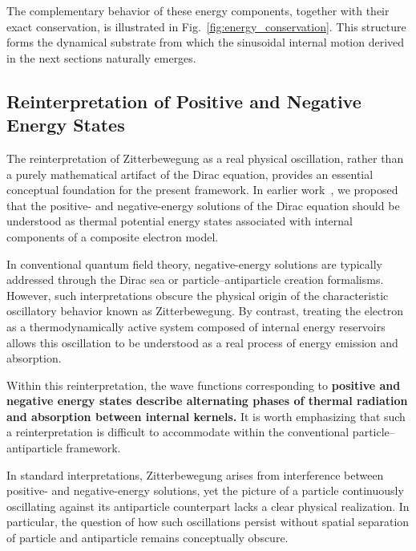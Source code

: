 \documentclass[%
 reprint,
 amsmath,amssymb,
 aps,
 prb,
]{revtex4-2}
\numberwithin{equation}{section}
\begin{document}
The complementary behavior of these energy components, together with their exact conservation, is illustrated in Fig.~\ref{fig:energy_conservation}. This structure forms the dynamical substrate from which the sinusoidal internal motion derived in the next sections naturally emerges.


\subsection{Reinterpretation of Positive and Negative Energy States}
\label{subsec:reinterpretation_positive}

The reinterpretation of Zitterbewegung as a real physical oscillation, rather than a purely mathematical artifact of the Dirac equation, provides an essential conceptual foundation for the present framework. In earlier work~\cite{hanamura17760132}, we proposed that the positive- and negative-energy solutions of the Dirac equation should be understood as thermal potential energy states associated with internal components of a composite electron model.

In conventional quantum field theory, negative-energy solutions are typically addressed through the Dirac sea or particle--antiparticle creation formalisms. However, such interpretations obscure the physical origin of the characteristic oscillatory behavior known as Zitterbewegung. By contrast, treating the electron as a thermodynamically active system composed of internal energy reservoirs allows this oscillation to be understood as a real process of energy emission and absorption.

Within this reinterpretation, the wave functions corresponding to \textbf{positive and negative energy states describe alternating phases of thermal radiation and absorption between internal kernels.} It is worth emphasizing that such a reinterpretation is difficult to accommodate within the conventional particle--antiparticle framework.

In standard interpretations, Zitterbewegung arises from interference between positive- and negative-energy solutions, yet the picture of a particle continuously oscillating against its antiparticle counterpart lacks a clear physical realization.
In particular, the question of how such oscillations persist without spatial separation of particle and antiparticle remains conceptually obscure.
\end{document}

